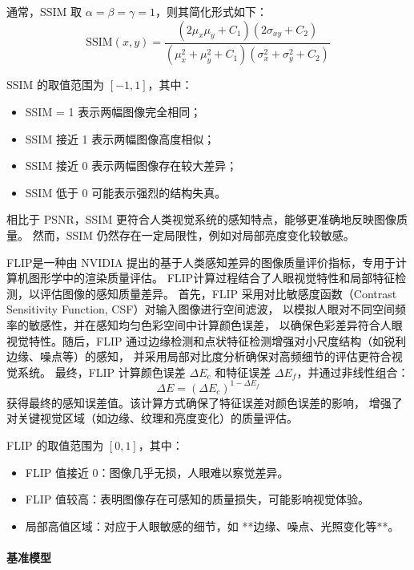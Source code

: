 通常，SSIM 取 $\alpha = \beta = \gamma = 1$，则其简化形式如下：
\begin{equation}
    \text{SSIM}(x, y) = \frac{(2\mu_x\mu_y + C_1)(2\sigma_{xy} + C_2)}{(\mu_x^2 + \mu_y^2 + C_1)(\sigma_x^2 + \sigma_y^2 + C_2)}
\end{equation}

SSIM 的取值范围为 $[-1,1]$，其中：
\begin{itemize}
    \item SSIM = 1 表示两幅图像完全相同；
    \item SSIM 接近 1 表示两幅图像高度相似；
    \item SSIM 接近 0 表示两幅图像存在较大差异；
    \item SSIM 低于 0 可能表示强烈的结构失真。
\end{itemize}

相比于 PSNR，SSIM 更符合人类视觉系统的感知特点，能够更准确地反映图像质量。
然而，SSIM 仍然存在一定局限性，例如对局部亮度变化较敏感。

FLIP是一种由 NVIDIA 提出的基于人类感知差异的图像质量评价指标，专用于计算机图形学中的渲染质量评估。
FLIP计算过程结合了人眼视觉特性和局部特征检测，以评估图像的感知质量差异。
首先，FLIP 采用对比敏感度函数（Contrast Sensitivity Function, CSF）对输入图像进行空间滤波，
以模拟人眼对不同空间频率的敏感性，并在感知均匀色彩空间中计算颜色误差，
以确保色彩差异符合人眼视觉特性。随后，FLIP 通过边缘检测和点状特征检测增强对小尺度结构（如锐利边缘、噪点等）的感知，
并采用局部对比度分析确保对高频细节的评估更符合视觉系统。
最终，FLIP 计算颜色误差 $\Delta E_c$ 和特征误差 $\Delta E_f$，并通过非线性组合：
\begin{equation}
    \Delta E = (\Delta E_c)^{1 - \Delta E_f}
\end{equation}
获得最终的感知误差值。该计算方式确保了特征误差对颜色误差的影响，
增强了对关键视觉区域（如边缘、纹理和亮度变化）的质量评估。

FLIP 的取值范围为 $[0,1]$，其中：
\begin{itemize}
    \item FLIP 值接近 0：图像几乎无损，人眼难以察觉差异。
    \item FLIP 值较高：表明图像存在可感知的质量损失，可能影响视觉体验。
    \item 局部高值区域：对应于人眼敏感的细节，如 **边缘、噪点、光照变化等**。
\end{itemize}

\paragraph{基准模型}

